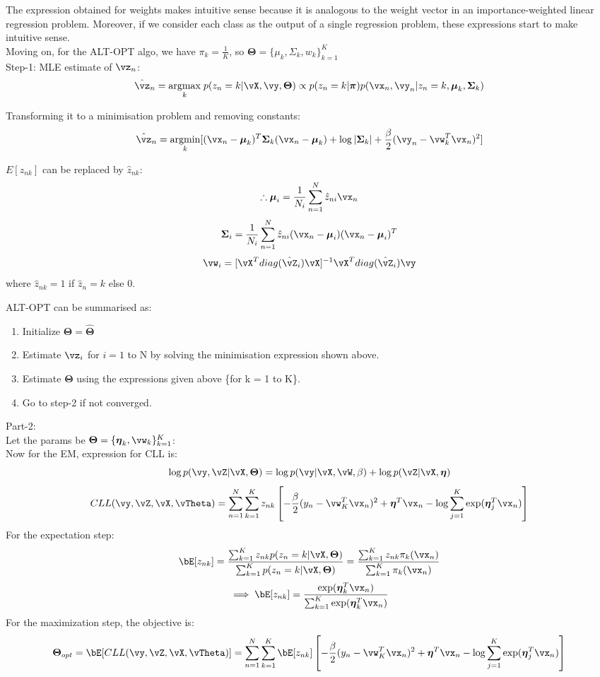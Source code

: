 \documentclass[a4paper,12pt]{article}
\begin{document}
\begin{mlsolution}
The expression obtained for weights makes intuitive sense because it is analogous to the weight vector in an importance-weighted linear regression problem. Moreover, if we consider each class as the output of a single regression problem, these expressions start to make intuitive sense.\\

Moving on, for the ALT-OPT algo, we have $\pi_k=\frac{1}{K}$, so $\boldsymbol\Theta=\{\mu_k,\Sigma_k,w_k\}_{k=1}^K$\\

Step-1: MLE estimate of $\vz_n$:
\[
\hat{\vz}_n=\underset{k}{\mathrm{arg max}}\;p(z_n=k|\vX,\vy,\boldsymbol\Theta)\propto p(z_n=k|\boldsymbol\pi)p(\vx_n,\vy_n|z_n=k,\boldsymbol\mu_k,\boldsymbol\Sigma_k)
\]

Transforming it to a minimisation problem and removing constants:
\[
\hat{\vz}_n=\underset{k}{\mathrm{arg min}}[(\vx_n-\boldsymbol\mu_k)^T\boldsymbol\Sigma_k(\vx_n-\boldsymbol\mu_k)+\log|\boldsymbol\Sigma_k|+\frac{\beta}{2}(\vy_n-\vw_k^T\vx_n)^2]
\]

$E[z_{nk}]$ can be replaced by $\hat{z}_{nk}$:
\[
\therefore \boldsymbol\mu_i = \frac{1}{N_i}\sum_{n=1}^N\hat{z}_{ni}\vx_n
\]
\[
\boldsymbol\Sigma_i = \frac{1}{N_i}\sum_{n=1}^N\hat{z}_{ni}(\vx_n-\boldsymbol\mu_i)(\vx_n-\boldsymbol\mu_i)^T
\]
\[
\vw_i=[\vX^Tdiag(\hat{\vZ}_i)\vX]^{-1}\vX^Tdiag(\hat{\vZ}_i)\vy
\]
where $\hat{z}_{nk}=1$ if $\hat{z}_{n}=k$ else 0.

ALT-OPT can be summarised as:
\begin{enumerate}
    \item Initialize $\boldsymbol\Theta=\hat{\boldsymbol\Theta}$
    \item Estimate $\vz_i$ for $i = 1$ to N by solving the minimisation expression shown above.
\item Estimate $\boldsymbol\Theta$ using the expressions given above \{for k = 1 to K\}.
\item Go to step-2 if not converged.
\end{enumerate}

Part-2:\\
Let the params be $\boldsymbol\Theta=\{\boldsymbol\eta_k,\boldsymbol\vw_k\}_{k=1}^K$:\\
Now for the EM, expression for CLL is:
\[
\log p(\vy,\vZ|\vX,\boldsymbol\Theta)=\log p(\vy|\vX,\vW,\beta)+\log p(\vZ|\vX,\boldsymbol\eta)
\]
\[
CLL(\vy,\vZ,\vX,\vTheta)=\sum_{n=1}^N\sum_{k=1}^Kz_{nk}\left[-\frac{\beta}{2}(y_n-\vw^T_K\vx_n)^2+\boldsymbol\eta^T\vx_n-\log\sum_{j=1}^K\exp(\boldsymbol\eta_j^T\vx_n)\right]
\]
For the expectation step:
\[
\bE[z_{nk}]=\frac{\sum_{k=1}^Kz_{nk}p(z_n=k|\vX,\boldsymbol\Theta)}{\sum_{k=1}^Kp(z_n=k|\vX,\boldsymbol\Theta)}=\frac{\sum_{k=1}^Kz_{nk}\pi_k(\vx_n)}{\sum_{k=1}^K\pi_k(\vx_n)}
\]
\[
\implies \bE[z_{nk}]=\frac{\exp(\boldsymbol\eta_k^T\vx_n)}{\sum_{k=1}^K\exp(\boldsymbol\eta_k^T\vx_n)}
\]
For the maximization step, the objective is:
\[
\boldsymbol\Theta_{opt}=\bE[CLL(\vy,\vZ,\vX,\vTheta)]=\sum_{n=1}^N\sum_{k=1}^K\bE[z_{nk}]\left[-\frac{\beta}{2}(y_n-\vw^T_K\vx_n)^2+\boldsymbol\eta^T\vx_n-\log\sum_{j=1}^K\exp(\boldsymbol\eta_j^T\vx_n)\right]
\]


\end{mlsolution}
\end{document}
